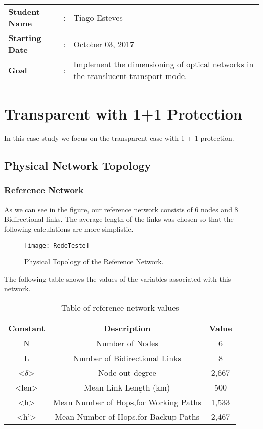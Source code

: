 \clearpage

\begin{tcolorbox}	
\begin{tabular}{p{2.75cm} p{0.2cm} p{10.5cm}} 	
\textbf{Student Name}  &:& Tiago Esteves\\
\textbf{Starting Date} &:& October 03, 2017\\
\textbf{Goal}          &:& Implement the dimensioning of optical networks in the translucent transport mode.
\end{tabular}
\end{tcolorbox}

\section{Transparent with 1+1 Protection}
In this case study we focus on the transparent case with 1 + 1 protection.

\subsection{Physical Network Topology}

\subsubsection{Reference Network}
As we can see in the figure, our reference network consists of 6 nodes and 8 Bidirectional links.
The average length of the links was chosen so that the following calculations are more simplistic.

\begin{figure}[h!]
\centering
\texttt{[image: RedeTeste]}
\caption{Physical Topology of the Reference Network.}
\end{figure}

The following table shows the values of the variables associated with this network.
\begin{table}[h!]
\centering
\begin{tabular}{|| c | c | c||}
 \hline
 Constant & Description & Value \\
 \hline\hline
 N & Number of Nodes & 6 \\
 L & Number of Bidirectional Links & 8 \\
 <$\delta$> & Node out-degree & 2,667 \\
 <len> & Mean Link Length (km) & 500 \\
 <h> & Mean Number of Hops,for Working Paths & 1,533 \\
 <h'> & Mean Number of Hops,for Backup Paths & 2,467 \\
 \hline
\end{tabular}
\caption{Table of reference network values}
\label{table:3}
\end{table}

